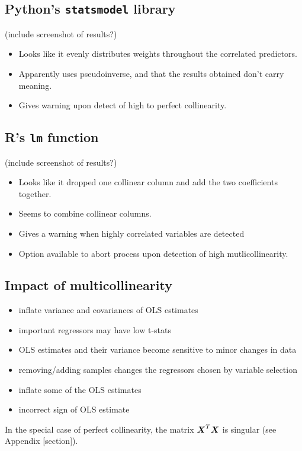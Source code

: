 \documentclass[12pt]{article}
\begin{document}
	\subsection{Python's \texttt{statsmodel} library}
	(include screenshot of results?)
	\begin{itemize}
		\item Looks like it evenly distributes weights throughout the correlated predictors.
		\item Apparently uses pseudoinverse, and that the results obtained don't carry meaning.
		\item Gives warning upon detect of high to perfect collinearity.
	\end{itemize}
	
	\subsection{R's \texttt{lm} function}
	(include screenshot of results?)
	
	\begin{itemize}
		\item Looks like it dropped one collinear column and add the two coefficients together.
		\item Seems to combine collinear columns.
		\item Gives a warning when highly correlated variables are detected
		\item Option available to abort process upon detection of high mutlicollinearity.
	\end{itemize}
	
	\subsection{Impact of multicollinearity}
	\begin{itemize}
		\item inflate variance and covariances of OLS estimates 
		\item important regressors may have low t-stats 
		\item  OLS estimates and their variance become sensitive to minor changes in data
		\item removing/adding samples changes the regressors chosen by variable selection
		\item  inflate some of the OLS estimates
		\item  incorrect sign of OLS estimate
	\end{itemize}
	
	In the special case of perfect collinearity, the matrix $\boldsymbol{X}^T\boldsymbol{X}$ is singular (see Appendix [section]).
	
\end{document}
